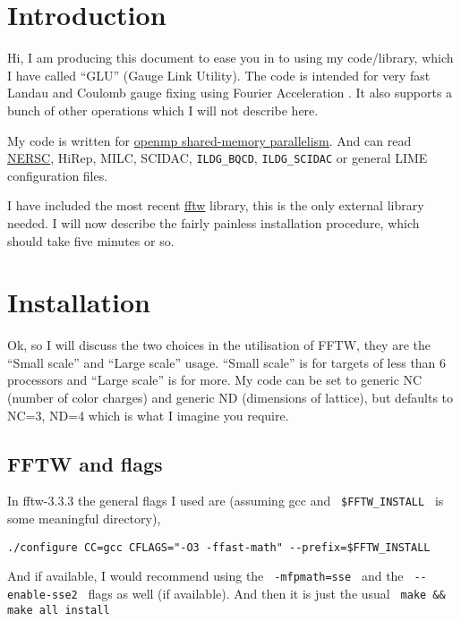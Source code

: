 \documentclass[12pt]{article}
\begin{document}
\section{Introduction}

Hi, I am producing this document to ease you in to using my code/library, which I have called ``GLU'' (Gauge Link Utility). The code is intended for very fast Landau and Coulomb gauge fixing using Fourier
Acceleration \cite{PhysRevD.37.1581}. It also supports a bunch of other operations which I will not describe here.

My code is written for \href{http://en.wikipedia.org/wiki/Openmp}{openmp shared-memory parallelism}. And can read
\href{http://lattices.qcdoc.bnl.gov/formatDescription/index.html}{NERSC}, HiRep, MILC, SCIDAC, \verb|ILDG_BQCD|, \verb|ILDG_SCIDAC| or general LIME configuration files.

I have included the most recent \href{http://www.fftw.org/}{fftw} library, this is the only external library needed. I
will now describe the fairly painless installation procedure, which should take five minutes or so.

\section{Installation}

Ok, so I will discuss the two choices in the utilisation of FFTW, they are the ``Small scale'' and ``Large scale''
usage. ``Small scale'' is for targets of less than 6 processors and ``Large scale'' is for more. My code can be set to
generic NC (number of color charges) and generic ND (dimensions of lattice), but defaults to NC=3, ND=4 which is what I
imagine you require.

\subsection{FFTW and flags}

In fftw-3.3.3 the general flags I used are (assuming gcc and \verb| $FFTW_INSTALL | is some meaningful directory),
\small{
\begin{verbatim}
./configure CC=gcc CFLAGS="-O3 -ffast-math" --prefix=$FFTW_INSTALL 
\end{verbatim}
}

And if available, I would recommend using the \verb| -mfpmath=sse | and the \verb| --enable-sse2 | flags as well (if
available). And then it is just the usual \verb| make && make all install | 
\end{document}
